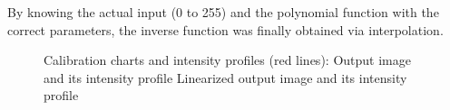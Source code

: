 By knowing the actual input (0 to 255) and the polynomial function with the correct parameters, the inverse function was finally obtained via interpolation.
\captionsetup[figure]{width=5in}
\begin{figure}[h!t]
	\centering
	\caption[Nonlinearized and linearized calibration charts and intensity profiles]{Calibration charts and intensity profiles (red lines):  Output image and
		 its intensity profile
		 Linearized output image and 
		 its intensity profile}
	\label{fig:calib}
\end{figure}

